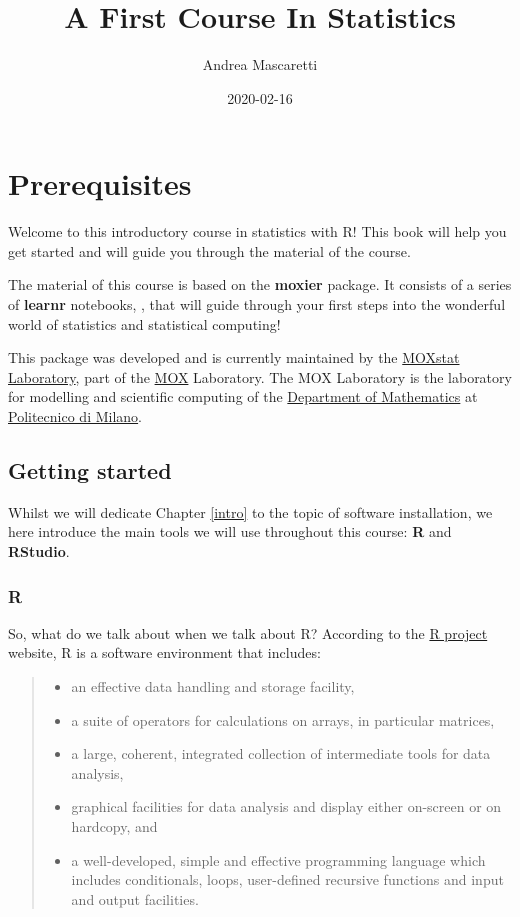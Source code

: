 \documentclass[]{book}
\title{A First Course In Statistics}
\author{Andrea Mascaretti}
\date{2020-02-16}
\providecommand{\tightlist}{%
  \setlength{\itemsep}{0pt}\setlength{\parskip}{0pt}}
\begin{document}
\maketitle

{
\setcounter{tocdepth}{1}
\tableofcontents
}
\chapter{Prerequisites}\label{prerequisites}

Welcome to this introductory course in statistics with R! This book will
help you get started and will guide you through the material of the
course.

The material of this course is based on the \textbf{moxier} package. It
consists of a series of \textbf{learnr} notebooks, \citep{R-learnr},
that will guide through your first steps into the wonderful world of
statistics and statistical computing!

This package was developed and is currently maintained by the
\href{https://statistics.mox.polimi.it/}{MOXstat Laboratory}, part of
the \href{https://mox.polimi.it/}{MOX} Laboratory. The MOX Laboratory is
the laboratory for modelling and scientific computing of the
\href{https://www.mate.polimi.it/?lg=en}{Department of Mathematics} at
\href{https://www.polimi.it}{Politecnico di Milano}.

\section{Getting started}\label{getting-started}

Whilst we will dedicate Chapter \ref{intro} to the topic of software
installation, we here introduce the main tools we will use throughout
this course: \textbf{R} and \textbf{RStudio}.

\subsection{R}\label{r}

So, what do we talk about when we talk about R? According to the
\href{https://www.r-project.org/about.html}{R project} website, R is a
software environment that includes:

\begin{quote}
\begin{itemize}
\tightlist
\item
  an effective data handling and storage facility,
\item
  a suite of operators for calculations on arrays, in particular
  matrices,
\item
  a large, coherent, integrated collection of intermediate tools for
  data analysis,
\item
  graphical facilities for data analysis and display either on-screen or
  on hardcopy, and
\item
  a well-developed, simple and effective programming language which
  includes conditionals, loops, user-defined recursive functions and
  input and output facilities.
\end{itemize}
\end{quote}
\end{document}
